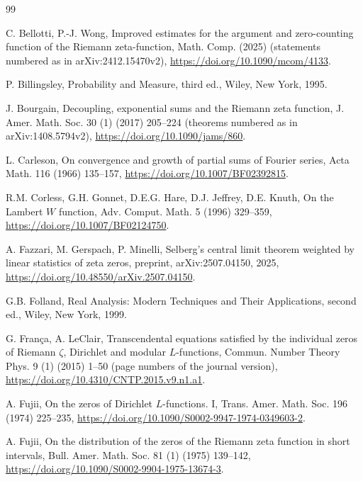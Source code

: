 \documentclass[preprint,12pt]{elsarticle}
\numberwithin{equation}{section}
\theoremstyle{plain}
\theoremstyle{definition}
\theoremstyle{remark}
\begin{document}
\begin{thebibliography}{99}

C. Bellotti, P.-J. Wong, Improved estimates for the argument and zero-counting function of the Riemann zeta-function, Math. Comp. (2025) (statements numbered as in arXiv:2412.15470v2), \href{https://doi.org/10.1090/mcom/4133}{https://doi.org/10.1090/mcom/4133}.

P. Billingsley, Probability and Measure, third ed., Wiley, New York, 1995.

J. Bourgain, Decoupling, exponential sums and the Riemann zeta function, J. Amer. Math. Soc. 30 (1) (2017) 205--224 (theorems numbered as in arXiv:1408.5794v2), \href{https://doi.org/10.1090/jams/860}{https://doi.org/10.1090/jams/860}.

L. Carleson, On convergence and growth of partial sums of Fourier series, Acta Math. 116 (1966) 135--157, \href{https://doi.org/10.1007/BF02392815}{https://doi.org/10.1007/BF02392815}.

R.M. Corless, G.H. Gonnet, D.E.G. Hare, D.J. Jeffrey, D.E. Knuth, On the Lambert $W$ function, Adv. Comput. Math. 5 (1996) 329--359, \href{https://doi.org/10.1007/BF02124750}{https://doi.org/10.1007/BF02124750}.

A. Fazzari, M. Gerspach, P. Minelli, Selberg's central limit theorem weighted by linear statistics of zeta zeros, preprint, arXiv:2507.04150, 2025, \href{https://doi.org/10.48550/arXiv.2507.04150}{https://doi.org/10.48550/arXiv.2507.04150}.

G.B. Folland, Real Analysis: Modern Techniques and Their Applications, second ed., Wiley, New York, 1999.




G. Fran\c{c}a, A. LeClair, Transcendental equations satisfied by the individual zeros of Riemann $\zeta$, Dirichlet and modular $L$-functions, Commun. Number Theory Phys. 9 (1) (2015) 1--50 (page numbers of the journal version), \href{https://doi.org/10.4310/CNTP.2015.v9.n1.a1}{https://doi.org/10.4310/CNTP.2015.v9.n1.a1}.

A. Fujii, On the zeros of Dirichlet $L$-functions. I, Trans. Amer. Math. Soc. 196 (1974) 225--235, \href{https://doi.org/10.1090/S0002-9947-1974-0349603-2}{https://doi.org/10.1090/S0002-9947-1974-0349603-2}.

A. Fujii, On the distribution of the zeros of the Riemann zeta function in short intervals, Bull. Amer. Math. Soc. 81 (1) (1975) 139--142, \href{https://doi.org/10.1090/S0002-9904-1975-13674-3}{https://doi.org/10.1090/S0002-9904-1975-13674-3}.


\end{thebibliography}
\end{document}
